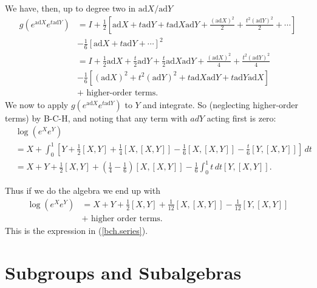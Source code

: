 \documentclass{amsbook}
\theoremstyle{plain}
\numberwithin{equation}{chapter}
\numberwithin{theorem}{chapter}
\begin{document}
We have, then, up to degree two in $\mathrm{ad}X/\mathrm{ad}Y$%
\begin{align*}
g\left(  e^{\mathrm{ad}X}e^{t\mathrm{ad}Y}\right)   & =I+\frac{1}{2}\left[
\mathrm{ad}X+t\mathrm{ad}Y+t\mathrm{ad}X\mathrm{ad}Y+\frac{\left(
\mathrm{ad}X\right)  ^{2}}{2}+\frac{t^{2}\left(  \mathrm{ad}Y\right)  ^{2}}%
{2}+\cdots\right] \\
& -\frac{1}{6}\left[  \mathrm{ad}X+t\mathrm{ad}Y+\cdots\right]  ^{2}\\
& =I+\frac{1}{2}\mathrm{ad}X+\frac{t}{2}\mathrm{ad}Y+\frac{t}{2}%
\mathrm{ad}X\mathrm{ad}Y+\frac{\left(  \mathrm{ad}X\right)  ^{2}}{4}%
+\frac{t^{2}\left(  \mathrm{ad}Y\right)  ^{2}}{4}\\
& -\frac{1}{6}\left[  \left(  \mathrm{ad}X\right)  ^{2}+t^{2}\left(
\mathrm{ad}Y\right)  ^{2}+t\mathrm{ad}X\mathrm{ad}Y+t\mathrm{ad}%
Y\mathrm{ad}X\right] \\
& +\text{ higher-order terms.}%
\end{align*}
We now to apply $g\left(  e^{\mathrm{ad}X}e^{t\mathrm{ad}Y}\right)  $ to $Y$
and integrate. So (neglecting higher-order terms) by B-C-H, and noting that
any term with $adY$ acting first is zero:
\begin{align*}
& \log\left(  e^{X}e^{Y}\right) \\
& =X+\int_{0}^{1}\left[  Y+\frac{1}{2}\left[  X,Y\right]  +\frac{1}{4}\left[
X,\left[  X,Y\right]  \right]  -\frac{1}{6}\left[  X,\left[  X,Y\right]
\right]  -\frac{t}{6}\left[  Y,\left[  X,Y\right]  \right]  \right]  \,dt\\
& =X+Y+\frac{1}{2}\left[  X,Y\right]  +\left(  \frac{1}{4}-\frac{1}{6}\right)
\left[  X,\left[  X,Y\right]  \right]  -\frac{1}{6}\int_{0}^{1}t\,dt\left[
Y,\left[  X,Y\right]  \right]  \text{.}%
\end{align*}

Thus if we do the algebra we end up with
\begin{align*}
\log\left(  e^{X}e^{Y}\right)   & =X+Y+\frac12\left[  X,Y\right]  +\frac
1{12}\left[  X,\left[  X,Y\right]  \right]  -\frac1{12}\left[  Y,\left[
X,Y\right]  \right] \\
& +\text{ higher order terms.}%
\end{align*}
This is the expression in (\ref{bch.series}).

\section{Subgroups and Subalgebras}
\end{document}

